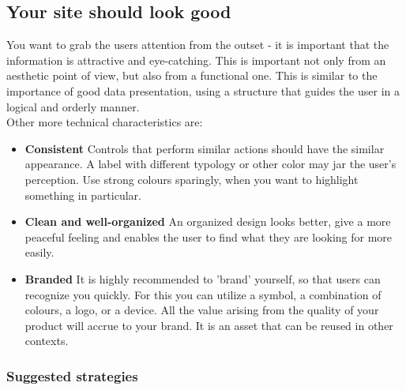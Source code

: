 \subsection{Your site should look good}

You want to grab the users attention from the outset - it is important that the information is attractive and eye-catching.
This is important not only from an aesthetic point of view, but also from a functional one.
This is similar to the importance of good data presentation, using a structure that guides the user in a logical and orderly manner.\\

Other more technical characteristics are:
\begin{itemize}
    \item\textbf{Consistent} Controls that perform similar actions should have the similar appearance.
    A label with different typology or other color may jar the user's perception. Use strong colours sparingly, when
    you want to highlight something in particular. \\

    \item\textbf{Clean and well-organized} An organized design looks better, give a more peaceful feeling and enables the user to find what they are looking for more easily. \\ 

    \item\textbf{Branded} It is highly recommended to 'brand' yourself, so that users can recognize you quickly. For this you can utilize a symbol, a combination of colours, a logo, or a device.
    All the value arising from the quality of your product will accrue to your brand. It is an asset that can be reused in other contexts. \\
\end{itemize}


\subsubsection*{Suggested strategies}

